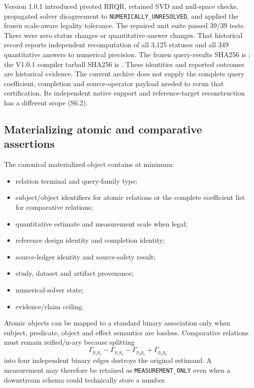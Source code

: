 \documentclass[11pt]{article}
\begin{document}
Version 1.0.1 introduced pivoted RRQR, retained SVD and null-space checks, propagated solver disagreement to \texttt{NUMERICALLY\_UNRESOLVED}, and applied the frozen scale-aware legality tolerance. The repaired unit suite passed 39/39 tests. There were zero status changes or quantitative-answer changes. That historical record reports independent recomputation of all 3,125 statuses and all 349 quantitative answers to numerical precision. The frozen query-results SHA256 is \texttt{}; the V1.0.1 compiler tarball SHA256 is \texttt{}. These identities and reported outcomes are historical evidence. The current archive does not supply the complete query coefficient, completion and source-operator payload needed to rerun that certification. Its independent native support and reference-target reconstruction has a different scope (S6.2).



\subsection{Materializing atomic and comparative assertions}
The canonical materialized object contains at minimum:
\begin{itemize}
\item relation terminal and query-family type;
\item subject/object identifiers for atomic relations or the complete coefficient list for comparative relations;
\item quantitative estimate and measurement scale when legal;
\item reference design identity and completion identity;
\item source-ledger identity and source-safety result;
\item study, dataset and artifact provenance;
\item numerical-solver state;
\item evidence/claim ceiling.
\end{itemize}

Atomic objects can be mapped to a standard binary association only when subject, predicate, object and effect semantics are lossless. Comparative relations must remain reified/n-ary because splitting
\[
\Gamma_{p_1g_1}-\Gamma_{p_1g_2}-\Gamma_{p_2g_1}+\Gamma_{p_2g_2}
\]
into four independent binary edges destroys the original estimand. A measurement may therefore be retained as \texttt{MEASUREMENT\_ONLY} even when a downstream schema could technically store a number.
\end{document}
